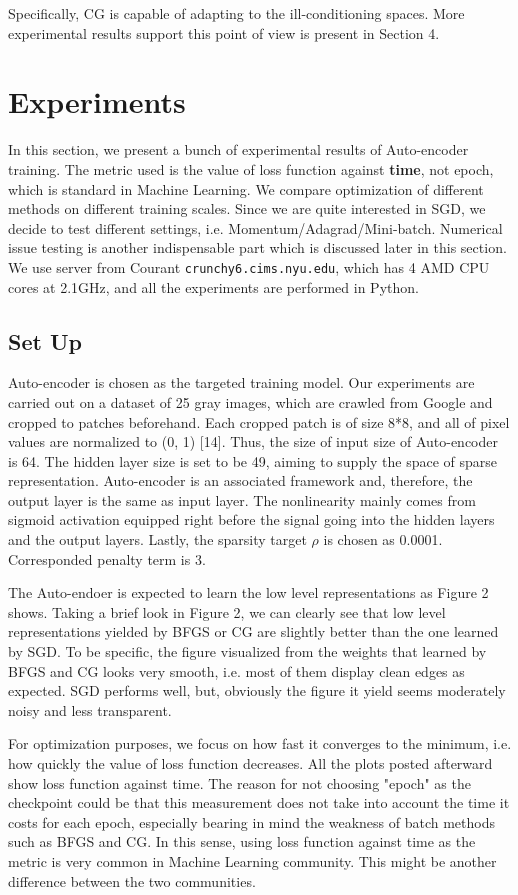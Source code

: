 \documentclass{article} %
\begin{document}
Specifically, CG is capable of adapting to the ill-conditioning spaces. More experimental results support this point of view is present in Section 4.

\section{Experiments}

In this section, we present a bunch of experimental results of Auto-encoder training. The metric used is the value of loss function against {\bf time}, not epoch, which is standard in Machine Learning. We compare optimization of different methods on different training scales. Since we are quite interested in SGD, we decide to test different settings, i.e. Momentum/Adagrad/Mini-batch. Numerical issue testing is another indispensable part which is discussed later in this section. We use server from Courant \texttt{crunchy6.cims.nyu.edu}, which has 4 AMD CPU cores at 2.1GHz, and all the experiments are performed in Python.

\subsection{Set Up}
Auto-encoder is chosen as the targeted training model. Our experiments are carried out on a dataset of 25 gray images, which are crawled from Google and cropped to patches beforehand. Each cropped patch is of size 8*8, and all of pixel values are normalized to (0, 1) [14]. Thus, the size of input size of Auto-encoder is 64. The hidden layer size is set to be 49, aiming to supply the space of sparse representation. Auto-encoder is an associated framework and, therefore, the output layer is the same as input layer. The nonlinearity mainly comes from sigmoid activation equipped right before the signal going into the hidden layers and the output layers. Lastly, the sparsity target $\rho$ is chosen as 0.0001. Corresponded penalty term is 3.

The Auto-endoer is expected to learn the low level representations as Figure 2 shows. Taking a brief look in Figure 2, we can clearly see that low level representations yielded by BFGS or CG are slightly better than the one learned by SGD. To be specific, the figure visualized from the weights that learned by BFGS and CG looks very smooth, i.e. most of them display clean edges as expected. SGD performs well, but, obviously the figure it yield seems moderately noisy and less transparent.

For optimization purposes, we focus on how fast it converges to the minimum, i.e. how quickly the value of loss function decreases. All the plots posted afterward show loss function against time. The reason for not choosing "epoch" as the checkpoint could be that this measurement does not take into account the time it costs for each epoch, especially bearing in mind the weakness of batch methods such as BFGS and CG. In this sense, using loss function against time as the metric is very common in Machine Learning community. This might be another difference between the two communities.
\end{document}
